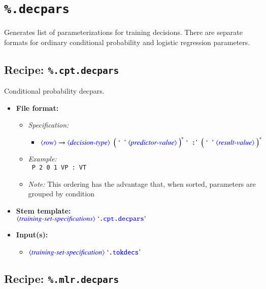 \documentclass[12pt]{report}
\def\blue{\color{blue}}
\def\magenta{\color{magenta}}
\begin{document}
\section{{\blue\tt \%.decpars}}

Generates list of parameterizations for training decisions. There are separate formats for ordinary conditional probability and logistic regression parameters.

\subsection{Recipe: \blue\tt \%.cpt.decpars}

Conditional probability decpars.

\begin{itemize}
      \item \textbf{File format:}
      \begin{itemize}
            \item \textit{Specification:}
            \begin{itemize}
                  \item {\small $\dtype{row} \rightarrow \dtype{decision-type} \ \ \smash{\Big( \ \dcode{\ } \ \dtype{predictor-value} \ \Big)^*} \ \dcode{ :} \ \ \smash{\Big( \ \dcode{\ } \ \dtype{result-value} \ \Big)^+}$}
            \end{itemize}
            \item \textit{Example:}\\
            {\magenta\tt
            P 2 0 1 VP : VT
            }
            \item \textit{Note:} This ordering has the advantage that, when sorted, parameters are grouped by condition
      \end{itemize}
      \item \textbf{Stem template:}\\
      $\dtype{training-set-specifications}  \ \dcode{.cpt.decpars}$
      \item \textbf{Input(s):}
      \begin{itemize}
            \item $\dtype{training-set-specification} \ \dcode{.tokdecs}$
      \end{itemize}
\end{itemize}

\subsection{Recipe: \blue\tt \%.mlr.decpars}
\end{document}
